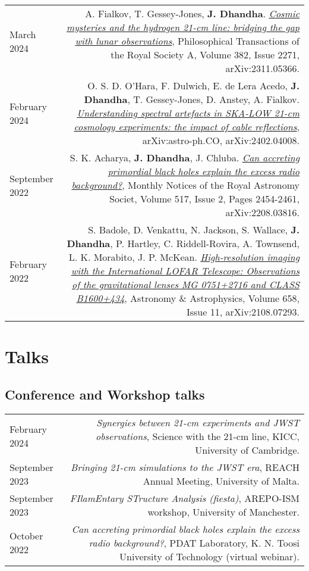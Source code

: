 \documentclass{article}
\begin{document}
\begin{tabular}{L!{\vrule}R}

    March 2024 & A. Fialkov, T. Gessey-Jones, \textbf{J. Dhandha}. \href{https://doi.org/10.1098/rsta.2023.0068}{\textit{Cosmic mysteries and the hydrogen 21-cm line: bridging the gap with lunar observations}}, Philosophical Transactions of the Royal Society A, Volume 382, Issue 2271, arXiv:2311.05366. \\

    February 2024 & O. S. D. O'Hara, F. Dulwich, E. de Lera Acedo, \textbf{J. Dhandha}, T. Gessey-Jones, D. Anstey, A. Fialkov. \href{https://arxiv.org/abs/2402.04008}{\textit{Understanding spectral artefacts in SKA-LOW 21-cm cosmology experiments: the impact of cable reflections}}, arXiv:astro-ph.CO, arXiv:2402.04008. \\

	  September 2022 & S. K. Acharya, \textbf{J. Dhandha}, J. Chluba. \href{https://doi.org/10.1093/mnras/stac2739}{\textit{Can accreting primordial black holes explain the excess radio background?}}, Monthly Notices of the Royal Astronomy Societ, Volume 517, Issue 2, Pages 2454-2461, arXiv:2208.03816. \\

	  February 2022 & S. Badole, D. Venkattu, N. Jackson, S. Wallace, \textbf{J. Dhandha}, P. Hartley, C. Riddell-Rovira, A. Townsend, L. K. Morabito, J. P. McKean. \href{https://doi.org/10.1051/0004-6361/202141227}{\textit{High-resolution imaging with the International LOFAR Telescope: Observations of the gravitational lenses MG 0751+2716 and CLASS B1600+434}}, Astronomy \& Astrophysics, Volume 658, Issue 11, arXiv:2108.07293. \\

\end{tabular}

\section*{Talks}
\subsection*{Conference and Workshop talks}
\begin{tabular}{L!{\vrule}R}

    February 2024 & \textit{Synergies between 21-cm experiments and JWST observations}, Science with the 21-cm line, KICC, University of Cambridge. \\

    September 2023 & \textit{Bringing 21-cm simulations to the JWST era}, REACH Annual Meeting, University of Malta. \\

    September 2023 & \textit{FIlamEntary STructure Analysis (fiesta)}, AREPO-ISM workshop, University of Manchester. \\

    October 2022 & \textit{Can accreting primordial black holes explain the excess radio background?}, PDAT Laboratory, K. N. Toosi University of Technology (virtual webinar). \\

\end{tabular}
\end{document}
